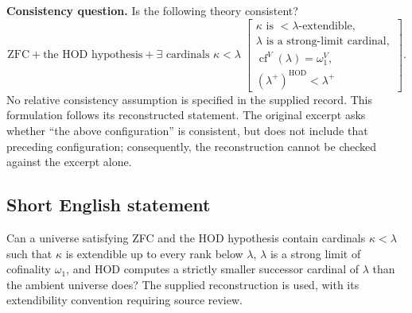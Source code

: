 \documentclass[11pt]{article}
\begin{document}
\textbf{Consistency question.} Is the following theory consistent?
\[
\mathrm{ZFC}+\text{the HOD hypothesis}
+\exists\text{ cardinals }\kappa<\lambda\;
\left[
\begin{gathered}
\kappa\text{ is }<\lambda\text{-extendible},\\
\lambda\text{ is a strong-limit cardinal},\\
\operatorname{cf}^{V}(\lambda)=\omega_1^{V},\\
(\lambda^+)^{\mathrm{HOD}}<\lambda^+
\end{gathered}
\right].
\]
No relative consistency assumption is specified in the supplied record. This formulation follows its reconstructed statement. The original excerpt asks whether ``the above configuration'' is consistent, but does not include that preceding configuration; consequently, the reconstruction cannot be checked against the excerpt alone.
\subsection{Short English statement}
Can a universe satisfying ZFC and the HOD hypothesis contain cardinals \(\kappa<\lambda\) such that \(\kappa\) is extendible up to every rank below \(\lambda\), \(\lambda\) is a strong limit of cofinality \(\omega_1\), and HOD computes a strictly smaller successor cardinal of \(\lambda\) than the ambient universe does? The supplied reconstruction is used, with its extendibility convention requiring source review.
\end{document}
